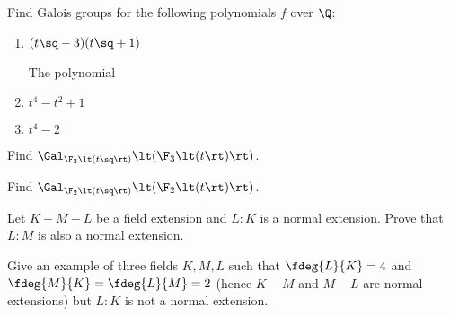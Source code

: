 \documentclass{article}
\begin{document}
\setcounter{section}{6} %
\begin{exercise}
Find Galois groups for the following polynomials $ f $ over $ \Q $:
\end{exercise}
\begin{enumerate}
  \item $ (t\sq-3)(t\sq+1) $
    \begin{solution}
      The polynomial
    \end{solution}

  \item $ t^4-t^2+1 $
    \begin{solution}

    \end{solution}

  \item $ t^4-2 $
    \begin{solution}

    \end{solution}
\end{enumerate}
\begin{subexercise}
  Find $ \Gal_{\F_3\lt(t\sq\rt)}\lt(\F_3\lt(t\rt)\rt) $.
\end{subexercise}
\begin{solution}

\end{solution}

\begin{subexercise}
  Find $ \Gal_{\F_2\lt(t\sq\rt)}\lt(\F_2\lt(t\rt)\rt) $.
\end{subexercise}
\begin{solution}

\end{solution}

\begin{subexercise}
  Let $K - M - L$ be a field extension and $ L:K $ is a normal extension.
  Prove that $L:M$ is also a normal extension.
\end{subexercise}
\begin{solution}

\end{solution}

\begin{subexercise}
  Give an example of three fields $K, M, L$ such that $\fdeg{L}{K} = 4$ and $ \fdeg{M}{K} = \fdeg{L}{M} = 2 $ (hence $ K-M $ and $ M-L $ are normal extensions) but $L : K$ is not a normal extension.
\end{subexercise}
\begin{solution}

\end{solution}
\end{document}
